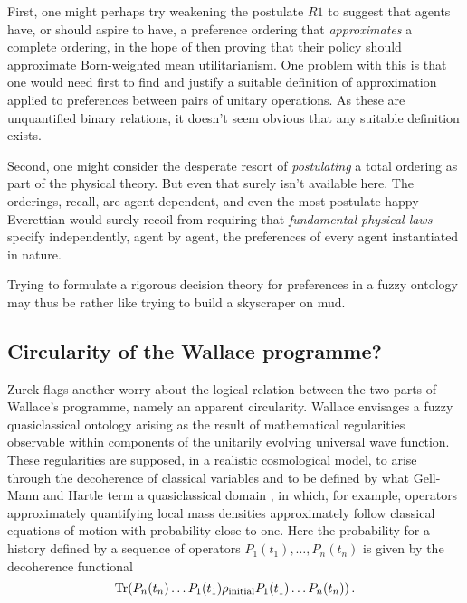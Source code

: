 \documentclass[aps,
pra,epsfig,12pt,nofootinbib]{revtex4}
\def\Tr{{\rm{Tr}}}
\begin{document}
First, one might perhaps try weakening the postulate $R1$ to suggest that agents
have, or should aspire to have, a preference ordering that 
{\it approximates} a complete ordering, in the hope of then proving that
their policy should approximate Born-weighted mean
utilitarianism.  One problem with this is that one would need first
to find and justify a suitable definition of approximation applied to
preferences between pairs of unitary operations.   As these
are unquantified binary relations, it doesn't seem obvious that any
suitable definition exists. 

Second, one might consider the desperate resort of {\it postulating} 
a total ordering as part of the physical theory.  But even that surely 
isn't available here.  The orderings, recall, are
agent-dependent, and even the most postulate-happy Everettian would surely
recoil from requiring that {\it fundamental physical laws} specify 
independently, agent by agent, the preferences of every agent 
instantiated in nature.   

Trying to formulate a rigorous decision theory for preferences in a 
fuzzy ontology may thus be rather like trying to build a skyscraper on 
mud.  

\subsection{Circularity of the Wallace programme?} 

Zurek \cite{zurekvol} flags another worry about the
logical relation between the two parts \cite{wallacevolone,wallacevoltwo}
of Wallace's programme, namely an apparent circularity.   
Wallace envisages a fuzzy quasiclassical ontology
arising as the result of mathematical regularities observable within
components of the unitarily evolving universal wave function.  
These regularities are supposed, in a realistic cosmological model,
to arise through the decoherence of classical variables and to be
defined by what Gell-Mann and Hartle term a quasiclassical 
domain \cite{hartlevol}, in which, for example, operators
approximately quantifying local mass densities approximately 
follow classical equations of motion with probability close to one.   
Here the probability for a history defined by a sequence of 
operators $P_1 (t_1) , \ldots , P_n (t_n )$ is given by the 
decoherence functional
\begin{equation}
\Tr ( P_n (t_n ) \ldots P_1 (t_1 ) \rho_{{\rm initial}} P_1 (t_1 ) \ldots
P_n (t_n ) ) \, . 
\end{equation}
\end{document}
